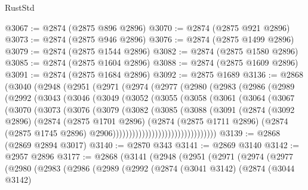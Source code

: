 \begin{lexlean}{RustStd}
\begin{coremodule}
{\begin{coremodule}
{{{{{{{{{{{{{{{{{{{{{{{{{{{{{{{{{{{{{{{{{{{{{{{{{{{{{{{{{{{{{{{{{{{{{{{{{{{{{{{{{{{{{@3067 := @2874 (@2875 @896 @2896)
@3070 := @2874 (@2875 @921 @2896)
@3073 := @2874 (@2875 @946 @2896)
@3076 := @2874 (@2875 @1499 @2896)
@3079 := @2874 (@2875 @1544 @2896)
@3082 := @2874 (@2875 @1580 @2896)
@3085 := @2874 (@2875 @1604 @2896)
@3088 := @2874 (@2875 @1609 @2896)
@3091 := @2874 (@2875 @1684 @2896)
@3092 := @2875 @1689
@3136 := @2868
    (@3040
      (@2948
        (@2951
          (@2971
            (@2974
              (@2977
                (@2980
                  (@2983
                    (@2986
                      (@2989
                        (@2992
                          (@3043
                            (@3046
                              (@3049
                                (@3052
                                  (@3055
                                    (@3058
                                      (@3061
                                        (@3064
                                          (@3067
                                            (@3070
                                              (@3073
                                                (@3076
                                                  (@3079
                                                    (@3082
                                                      (@3085
                                                        (@3088
                                                          (@3091
                                                            (@2874
                                                              (@3092 @2896)
                                                              (@2874
                                                                (@2875 @1701 @2896)
                                                                (@2874
                                                                  (@2875 @1711 @2896)
                                                                  (@2874
                                                                    (@2875 @1745 @2896)
                                                                    @2906))))))))))))))))))))))))))))))))
@3139 := @2868 (@2869 @2894 @3017)
@3140 := @2870 @343
@3141 := @2869 @3140
@3142 := @2957 @2896
@3177 := @2868
    (@3141
      (@2948
        (@2951
          (@2971
            (@2974
              (@2977
                (@2980
                  (@2983
                    (@2986
                      (@2989
                        (@2992
                          (@2874
                            (@3041 @3142)
                            (@2874
                              (@3044 @3142)
}}}}}}}}}}}}}}}}}}}}}}}}}}}}}}}}}}}}}}}}}}}}}}}}}}}}}}}}}}}}}}}}}}}}}}}}}}}}}}}}}}}}}
\end{coremodule}}
\end{coremodule}
\end{lexlean}
